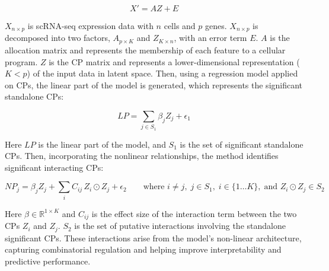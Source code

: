 \documentclass[11pt]{article}
\begin{document}
\begin{equation}
X' = AZ + E
\end{equation}

$X_{n \times p}$ is scRNA-seq expression data with $n$ cells and $p$ genes.
$X_{n \times p}$ is decomposed into two factors, $A_{p \times K}$ and $Z_{K \times n}$,
with an error term $E$. $A$ is the allocation matrix and represents the membership of
each feature to a cellular program. $Z$ is the CP matrix and represents a
lower-dimensional representation ($K < p$) of the input data in latent space. Then,
using a regression model applied on CPs, the linear part of the model is generated,
which represents the significant standalone CPs:

\begin{equation}
LP = \sum_{j \in S_{1}} \beta_{j} Z_{j} + \epsilon_{1}
\end{equation}

Here $LP$ is the linear part of the model, and $S_{1}$ is the set of significant
standalone CPs. Then, incorporating the nonlinear relationships, the method
identifies significant interacting CPs:

\begin{equation}
NP_{j} = \beta_{j} Z_{j} + \sum_{i} C_{ij}\, Z_{i} \odot Z_{j} + \epsilon_{2}
\qquad \text{where } i \neq j,\; j \in S_{1},\; i \in \{1 \dots K\},\;
\text{and } Z_{i} \odot Z_{j} \in S_{2}
\end{equation}

Here $\beta \in \mathbb{R}^{1 \times K}$ and $C_{ij}$ is the effect size of the
interaction term between the two CPs $Z_{i}$ and $Z_{j}$. $S_{2}$ is the set of putative
interactions involving the standalone significant CPs. These interactions arise from the
model's non-linear architecture, capturing combinatorial regulation and helping improve
interpretability and predictive performance.
\end{document}
